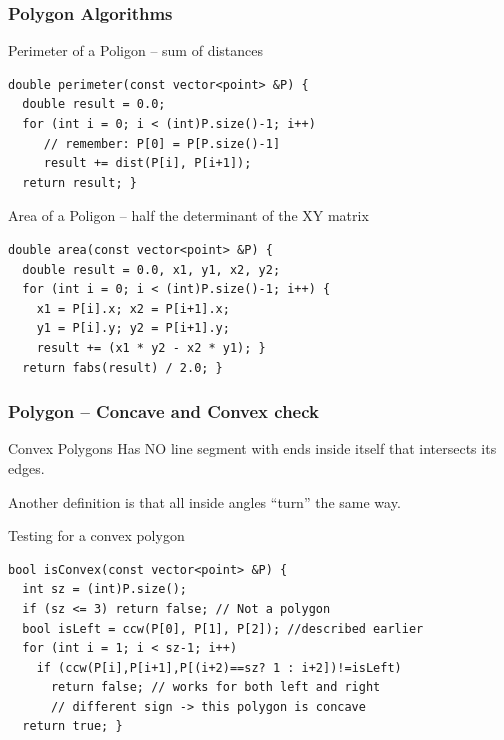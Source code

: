 \documentclass{beamer}
\begin{document}
\begin{frame}
  \frametitle{Polygon Algorithms}
  {\smaller
    \begin{exampleblock}{Perimeter of a Poligon -- sum of distances}
\begin{verbatim}
double perimeter(const vector<point> &P) {
  double result = 0.0;
  for (int i = 0; i < (int)P.size()-1; i++) 
     // remember: P[0] = P[P.size()-1]
     result += dist(P[i], P[i+1]);
  return result; }
\end{verbatim}
    \end{exampleblock}

    \begin{exampleblock}{Area of a Poligon -- half the determinant of the XY matrix}
\begin{verbatim}
double area(const vector<point> &P) {
  double result = 0.0, x1, y1, x2, y2;
  for (int i = 0; i < (int)P.size()-1; i++) {
    x1 = P[i].x; x2 = P[i+1].x;
    y1 = P[i].y; y2 = P[i+1].y;
    result += (x1 * y2 - x2 * y1); }
  return fabs(result) / 2.0; }
\end{verbatim}
    \end{exampleblock}

}
\end{frame}


\begin{frame}
  \frametitle{Polygon -- Concave and Convex check}
  {\smaller
    \begin{block}{Convex Polygons}
      Has NO line segment with ends inside itself that intersects its
      edges.

      \medskip

      Another definition is that all inside angles ``turn'' the same
      way.      
    \end{block}

    \begin{exampleblock}{Testing for a convex polygon}
\begin{verbatim}
bool isConvex(const vector<point> &P) {
  int sz = (int)P.size();
  if (sz <= 3) return false; // Not a polygon
  bool isLeft = ccw(P[0], P[1], P[2]); //described earlier
  for (int i = 1; i < sz-1; i++)
    if (ccw(P[i],P[i+1],P[(i+2)==sz? 1 : i+2])!=isLeft)
      return false; // works for both left and right
      // different sign -> this polygon is concave
  return true; }
\end{verbatim}
    \end{exampleblock}
  }
\end{frame}
\end{document}
